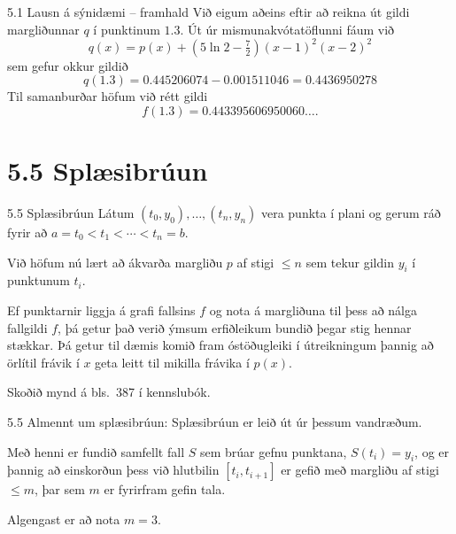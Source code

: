 \begin{frame}{5.1 Lausn á sýnidæmi -- framhald} 
Við eigum aðeins eftir að reikna út gildi 
margliðunnar $q$ í punktinum $1.3$.  Út úr mismunakvótatöflunni
fáum við
$$
q(x)=p(x)+(5\ln 2-\tfrac 72)(x-1)^2(x-2)^2
$$
sem gefur okkur gildið
$$
q(1.3)=0.445206074-0.001511046=0.4436950278
$$
Til samanburðar höfum við rétt gildi
$$f(1.3)=0.443395606950060\ldots.
$$
\end{frame}

\section*{5.5 Splæsibrúun}

\begin{frame}{5.5 Splæsibrúun} 
Látum $(t_0,y_0),\dots,(t_n,y_n)$ vera punkta í plani og gerum ráð
fyrir að $a=t_0<t_1<\cdots<t_n=b$. 

\pause
\smallskip
Við höfum nú lært að ákvarða
margliðu $p$ af stigi $\leq n$ sem tekur gildin $y_i$ í punktunum
$t_i$.  

\pause
\smallskip
Ef punktarnir liggja á grafi fallsins $f$ og nota á margliðuna
til þess að nálga fallgildi $f$, þá getur það verið ýmsum erfiðleikum
bundið þegar stig hennar stækkar. Þá getur til dæmis komið fram
óstöðugleiki í útreikningum þannig að örlítil frávik í $x$ geta leitt
til mikilla frávika í $p(x)$. 

\pause
\smallskip
Skoðið mynd á bls.~387 í kennslubók.
\end{frame}

\begin{frame}{5.5 Almennt um splæsibrúun:} 
Splæsibrúun er leið út úr þessum vandræðum. 

\pause
\smallskip
Með henni er fundið
samfellt fall $S$ sem brúar gefnu punktana, $S(t_i)=y_i$, og er þannig
að einskorðun þess við hlutbilin $[t_i,t_{i+1}]$ er gefið með margliðu
af stigi $\leq m$, þar sem $m$ er fyrirfram gefin tala. 

\pause
\smallskip
Algengast er að nota $m=3$.
\end{frame}


